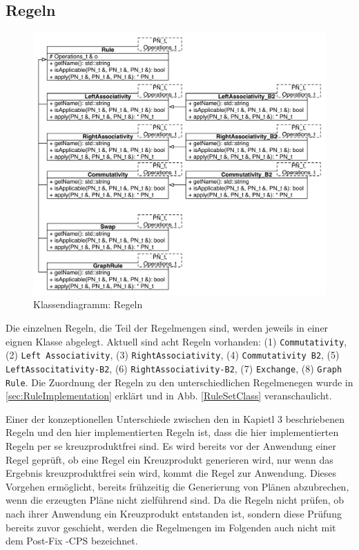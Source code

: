 \subsection{Regeln}

\begin{figure}[ht]
  \centering
  \includegraphics[scale=0.75]{04_Implementierung/00_media/Rules.pdf}
  \caption{Klassendiagramm: Regeln}
  \label{RuleClassDiagram}
\end{figure}

Die einzelnen Regeln, die Teil der Regelmengen sind, werden jeweils in einer eignen Klasse abgelegt. Aktuell sind acht Regeln vorhanden: (1) \texttt{Commutativity}, (2) \texttt{Left Associativity}, (3) \texttt{Right\-Associativity}, (4) \texttt{Commu\-tativity B2}, (5) \texttt{Left\-Associtativity-B2}, (6) \texttt{Right\-Associativity-B2}, (7) \texttt{Exchange}, (8) \texttt{Graph Rule}. Die Zuordnung der Regeln zu den unterschiedlichen Regelmenegen wurde in \ref{sec:RuleImplementation} erklärt und in Abb. \ref{RuleSetClass} veranschaulicht.

Einer der konzeptionellen Unterschiede zwischen den in Kapietl 3 beschriebenen Regeln und den hier implementierten Regeln ist, dass die hier implementierten Regeln per se kreuzproduktfrei sind. Es wird bereits vor der Anwendung einer Regel geprüft, ob eine Regel ein Kreuzprodukt generieren wird, nur wenn das Ergebnis kreuzproduktfrei sein wird, kommt die Regel zur Anwendung. Dieses Vorgehen ermöglicht,  bereits frühzeitig die Generierung von Plänen abzubrechen, wenn die erzeugten Pläne nicht zielführend sind. Da die Regeln nicht prüfen, ob nach ihrer Anwendung ein Kreuzprodukt entstanden ist, sondern diese Prüfung bereits zuvor geschieht, werden die Regelmengen im Folgenden auch nicht mit dem Post-Fix -CPS bezeichnet.

